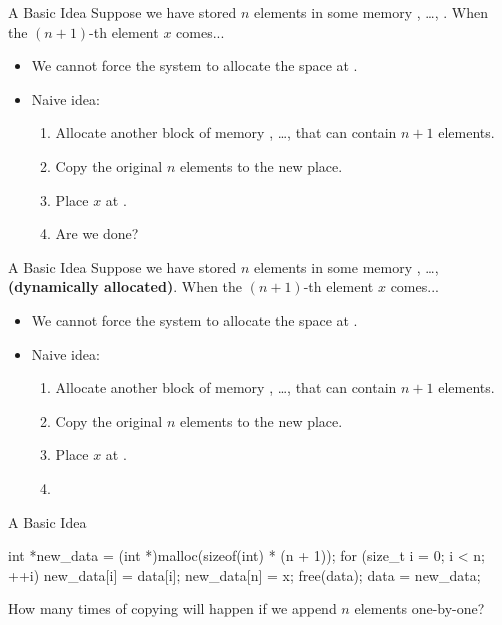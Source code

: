 \documentclass{beamer}
\begin{document}
\begin{frame}{A Basic Idea}
    Suppose we have stored \(n\) elements in some  memory , \dots, . When the \((n+1)\)-th element \(x\) comes...
    \begin{itemize}
        \item We cannot force the system to allocate the space at .
        \pause
        \item Naive idea:
        \begin{enumerate}
            \item Allocate another block of memory , \dots,  that can contain \(n+1\) elements.
            \item Copy the original \(n\) elements to the new place.
            \item Place \(x\) at .
            \pause
            \item Are we done?
        \end{enumerate}
    \end{itemize}
\end{frame}

\begin{frame}{A Basic Idea}
    Suppose we have stored \(n\) elements in some  memory , \dots,  \textbf{(dynamically allocated)}. When the \((n+1)\)-th element \(x\) comes...
    \begin{itemize}
        \item We cannot force the system to allocate the space at .
        \item Naive idea:
        \begin{enumerate}
            \item Allocate another block of memory , \dots,  that can contain \(n+1\) elements.
            \item Copy the original \(n\) elements to the new place.
            \item Place \(x\) at .
            \item {}
        \end{enumerate}
    \end{itemize}
\end{frame}

\begin{frame}[fragile]{A Basic Idea}
    \begin{cpp}
int *new_data
    = (int *)malloc(sizeof(int) * (n + 1));
for (size_t i = 0; i < n; ++i)
  new_data[i] = data[i];
new_data[n] = x;
free(data);
data = new_data;
    \end{cpp}
    \pause
    \begin{question}
        How many times of copying will happen if we append \(n\) elements one-by-one?
    \end{question}
\end{frame}
\end{document}
